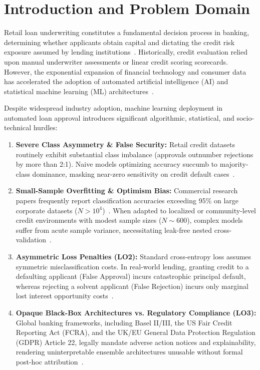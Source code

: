 \documentclass{COMPXXXX}
\begin{document}
\section{Introduction and Problem Domain}
\label{sec:intro}

Retail loan underwriting constitutes a fundamental decision process in banking, determining whether applicants obtain capital and dictating the credit risk exposure assumed by lending institutions~\cite{lessmann2015}. Historically, credit evaluation relied upon manual underwriter assessments or linear credit scoring scorecards. However, the exponential expansion of financial technology and consumer data has accelerated the adoption of automated artificial intelligence (AI) and statistical machine learning (ML) architectures~\cite{bussmann2021}.

Despite widespread industry adoption, machine learning deployment in automated loan approval introduces significant algorithmic, statistical, and socio-technical hurdles:
\begin{enumerate}
    \item \textbf{Severe Class Asymmetry \& False Security:} Retail credit datasets routinely exhibit substantial class imbalance (approvals outnumber rejections by more than 2:1). Naive models optimizing accuracy succumb to majority-class dominance, masking near-zero sensitivity on credit default cases~\cite{hand2009}.
    \item \textbf{Small-Sample Overfitting \& Optimism Bias:} Commercial research papers frequently report classification accuracies exceeding 95\% on large corporate datasets ($N > 10^4$)~\cite{gawande2026}. When adapted to localized or community-level credit environments with modest sample sizes ($N \sim 600$), complex models suffer from acute sample variance, necessitating leak-free nested cross-validation~\cite{zhang2025}.
    \item \textbf{Asymmetric Loss Penalties (LO2):} Standard cross-entropy loss assumes symmetric misclassification costs. In real-world lending, granting credit to a defaulting applicant (False Approval) incurs catastrophic principal default, whereas rejecting a solvent applicant (False Rejection) incurs only marginal lost interest opportunity costs~\cite{lessmann2015}.
    \item \textbf{Opaque Black-Box Architectures vs. Regulatory Compliance (LO3):} Global banking frameworks, including Basel II/III, the US Fair Credit Reporting Act (FCRA), and the UK/EU General Data Protection Regulation (GDPR) Article 22, legally mandate adverse action notices and explainability, rendering uninterpretable ensemble architectures unusable without formal post-hoc attribution~\cite{ali2024,bussmann2021}.
\end{enumerate}
\end{document}
